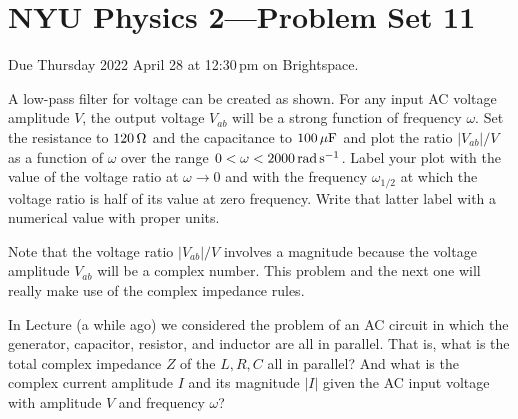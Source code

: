 \documentclass[12pt]{article}
\begin{document}
\section*{NYU Physics 2---Problem Set 11}

Due Thursday 2022 April 28 at 12:30\,pm on Brightspace.

\startproblem%
A low-pass filter for voltage can be created as shown.
For any input AC voltage amplitude $V$,
the output voltage $V_{ab}$ will be a strong function of frequency $\omega$.
Set the resistance to $120\,\ohm$ and the capacitance to $100\,\muF$
and plot the ratio $|V_{ab}|/V$ as a function of
$\omega$ over the range $0<\omega<2000\,\radps$.
Label your plot with the value of the voltage ratio at $\omega\rightarrow 0$ and
with the frequency $\omega_{1/2}$ at which the voltage ratio is half of its
value at zero frequency. Write that latter label with a numerical value with proper
units.

Note that the voltage ratio $|V_{ab}|/V$ involves a magnitude because the
voltage amplitude $V_{ab}$ will be a complex number. This problem and the
next one will really make use of the complex impedance rules.

\startproblem%
In Lecture (a while ago) we considered the problem of an AC circuit in which the generator,
capacitor, resistor, and inductor are all in parallel.
That is, what is the total complex impedance $Z$ of the $L, R, C$ all in parallel?
And what is the complex current amplitude $I$
and its magnitude $|I|$ given the AC input voltage
with amplitude $V$ and frequency $\omega$?
\end{document}
